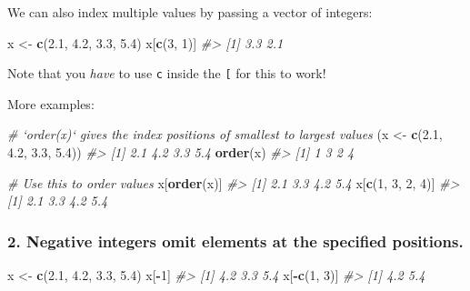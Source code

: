 \documentclass[]{book}
\newenvironment{Shaded}{\begin{snugshade}}{\end{snugshade}}
\newcommand{\KeywordTok}[1]{\textcolor[rgb]{0.13,0.29,0.53}{\textbf{#1}}}
\newcommand{\DecValTok}[1]{\textcolor[rgb]{0.00,0.00,0.81}{#1}}
\newcommand{\FloatTok}[1]{\textcolor[rgb]{0.00,0.00,0.81}{#1}}
\newcommand{\StringTok}[1]{\textcolor[rgb]{0.31,0.60,0.02}{#1}}
\newcommand{\CommentTok}[1]{\textcolor[rgb]{0.56,0.35,0.01}{\textit{#1}}}
\newcommand{\OperatorTok}[1]{\textcolor[rgb]{0.81,0.36,0.00}{\textbf{#1}}}
\newcommand{\NormalTok}[1]{#1}
\begin{document}
We can also index multiple values by passing a vector of integers:

\begin{Shaded}
\begin{Highlighting}[]
\NormalTok{x <-}\StringTok{ }\KeywordTok{c}\NormalTok{(}\FloatTok{2.1}\NormalTok{, }\FloatTok{4.2}\NormalTok{, }\FloatTok{3.3}\NormalTok{, }\FloatTok{5.4}\NormalTok{)}
\NormalTok{x[}\KeywordTok{c}\NormalTok{(}\DecValTok{3}\NormalTok{, }\DecValTok{1}\NormalTok{)]}
\CommentTok{#> [1] 3.3 2.1}
\end{Highlighting}
\end{Shaded}

Note that you \emph{have} to use \texttt{c} inside the \texttt{{[}} for
this to work!

More examples:

\begin{Shaded}
\begin{Highlighting}[]
\CommentTok{# `order(x)` gives the index positions of smallest to largest values}
\NormalTok{(x <-}\StringTok{ }\KeywordTok{c}\NormalTok{(}\FloatTok{2.1}\NormalTok{, }\FloatTok{4.2}\NormalTok{, }\FloatTok{3.3}\NormalTok{, }\FloatTok{5.4}\NormalTok{))}
\CommentTok{#> [1] 2.1 4.2 3.3 5.4}
\KeywordTok{order}\NormalTok{(x)}
\CommentTok{#> [1] 1 3 2 4}

\CommentTok{# Use this to order values}
\NormalTok{x[}\KeywordTok{order}\NormalTok{(x)]}
\CommentTok{#> [1] 2.1 3.3 4.2 5.4}
\NormalTok{x[}\KeywordTok{c}\NormalTok{(}\DecValTok{1}\NormalTok{, }\DecValTok{3}\NormalTok{, }\DecValTok{2}\NormalTok{, }\DecValTok{4}\NormalTok{)]}
\CommentTok{#> [1] 2.1 3.3 4.2 5.4}
\end{Highlighting}
\end{Shaded}

\subsubsection*{\texorpdfstring{2. \textbf{Negative integers} omit
elements at the specified
positions.}{2. Negative integers omit elements at the specified positions.}}\label{negative-integers-omit-elements-at-the-specified-positions.}

\begin{Shaded}
\begin{Highlighting}[]
\NormalTok{x <-}\StringTok{ }\KeywordTok{c}\NormalTok{(}\FloatTok{2.1}\NormalTok{, }\FloatTok{4.2}\NormalTok{, }\FloatTok{3.3}\NormalTok{, }\FloatTok{5.4}\NormalTok{)}
\NormalTok{x[}\OperatorTok{-}\DecValTok{1}\NormalTok{]}
\CommentTok{#> [1] 4.2 3.3 5.4}
\NormalTok{x[}\OperatorTok{-}\KeywordTok{c}\NormalTok{(}\DecValTok{1}\NormalTok{, }\DecValTok{3}\NormalTok{)]}
\CommentTok{#> [1] 4.2 5.4}
\end{Highlighting}
\end{Shaded}
\end{document}
